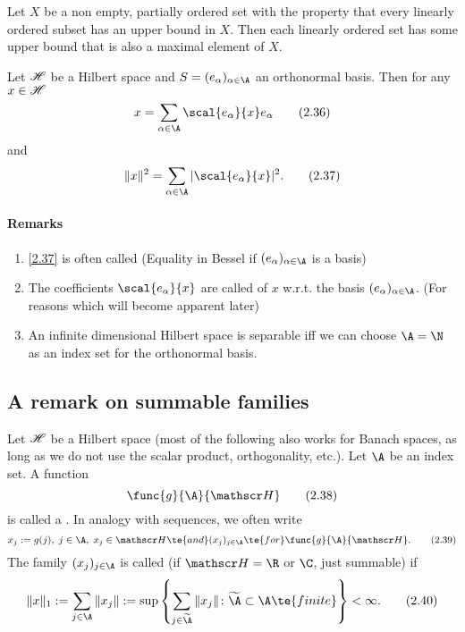 \begin{thm}\label{ii.18}
    Let $X$ be a non empty, partially ordered set with the property that every linearly ordered subset has an upper bound in $X$. Then each linearly ordered set has some upper bound that is also a maximal element of $X$.
\end{thm}

\begin{thm}\label{ii.19}
    Let $\mathscr{H}$ be a Hilbert space and $S=(e_\alpha)_{\alpha\in\A}$ an orthonormal basis. Then for any $x\in\mathscr{H}$
    \[x=\sum_{\alpha\in\A}\scal{e_\alpha}{x}e_\alpha\tag{2.36}\label{2.36}\]
    and
    \[\|x\|^2=\sum_{\alpha\in\A}|\scal{e_\alpha}{x}|^2.\tag{2.37}\label{2.37}\]
\end{thm}

\paragraph{Remarks}
\begin{enumerate}[label=\arabic*)]
    \item \eqref{2.37} is often called  (Equality in Bessel if $(e_{\alpha})_{\alpha\in\A}$ is a basis)
    \item The coefficients $\scal{e_{\alpha}}{x}$ are called  of $x$ w.r.t. the basis $(e_{\alpha})_{\alpha\in\A}$. (For reasons which will become apparent later)
    \item An infinite dimensional Hilbert space is separable iff we can choose $\A=\N$ as an index set for the orthonormal basis.
\end{enumerate}

\subsection{A remark on summable families}
Let $\mathscr{H}$ be a Hilbert space (most of the following also works for Banach spaces, 
as long as we do not use the scalar product, orthogonality, etc.). Let $\A$ be an index set. 
A function \[\func{g}{\A}{\H}\tag{2.38}\label{2.38}\] is called a .
In analogy with sequences, we often write
\[x_j:=g(j),\;j\in\A,\;x_j\in\H\te{ and }(x_j)_{j\in\A}\te{ for }\func{g}{\A}{\H}.\tag{2.39}\label{2.39}\]
The family $(x_j)_{j\in\A}$ is called  (if $\H=\R$ or $\C$, just summable) if
\[\|x\|_1:=\sum_{j\in\A}\|x_j\|:=\sup\left\{\sum_{j\in\widetilde{\A}}\|x_j\|\colon\widetilde{\A}\subset\A\te{ finite}\right\}<\infty.\tag{2.40}\label{2.40}\]

